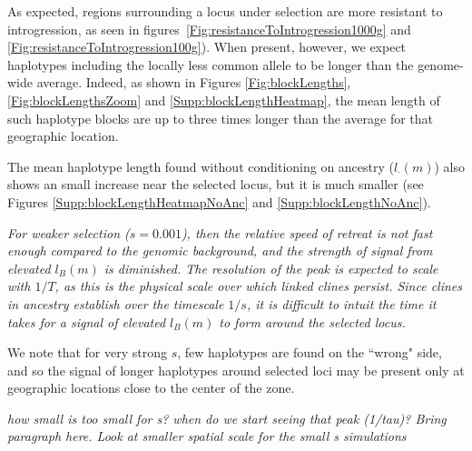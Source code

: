 \documentclass[11pt,letterpaper]{article}
\newcommand{\alisa}[1]{{\em \color{red} #1}}
\begin{document}
As expected, regions surrounding a locus under selection are more resistant to introgression,
as seen in figures~\ref{Fig:resistanceToIntrogression1000g} and \ref{Fig:resistanceToIntrogression100g}).
When present, however, we expect haplotypes including the locally less common allele
to be longer than the genome-wide average.
Indeed,
as shown in Figures \ref{Fig:blockLengths}, \ref{Fig:blockLengthsZoom} and \ref{Supp:blockLengthHeatmap},
the mean length of such haplotype blocks are up to three times longer
than the average for that geographic location.


The mean haplotype length found without conditioning on ancestry ($l_\cdot(m)$)
also shows an small increase near the selected locus,
but it is much smaller (see Figures \ref{Supp:blockLengthHeatmapNoAnc} and \ref{Supp:blockLengthNoAnc}).

\alisa{For weaker selection ($s=0.001$), then the relative speed of retreat is not fast enough compared to the genomic background, and the strength of signal from elevated $l_B(m)$ is diminished. The resolution of the peak is expected to scale with $1/T$, as this is the physical scale over which linked clines persist. Since clines in ancestry establish over the timescale $1/s$, it is difficult to intuit the time it takes for a signal of elevated $l_B(m)$ to form around the selected locus. 

We note that for very strong $s$, few haplotypes are found on the ``wrong" side, and so the signal of longer haplotypes around selected loci may be present only at geographic locations close to the center of the zone.}




\alisa{how small is too small for s? when do we start seeing that peak (1/tau)? Bring paragraph here. Look at smaller spatial scale for the small s simulations}
\end{document}
